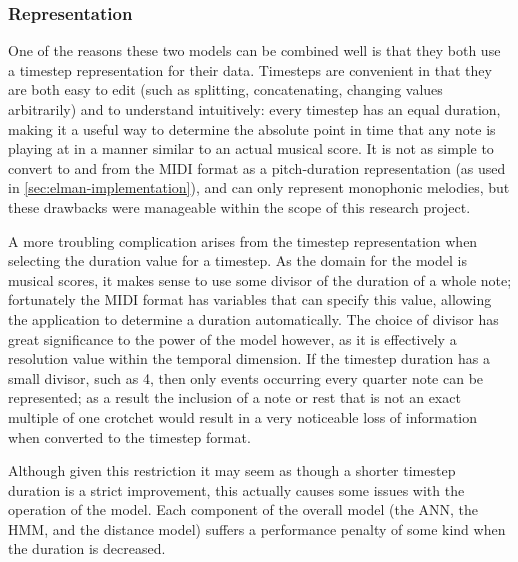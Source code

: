 \documentclass[ author={Stephen Livermore-Tozer},
				supervisor={Dr. Peter Flach},
				degree={MEng},
				title={Algorithmic Co-composition Using Machine Learning},
				subtitle={},
				type={research},
				year={2016} ]{dissertation}
\begin{document}
	\subsubsection{Representation}
	
	One of the reasons these two models can be combined well is that they both use a timestep representation for their data. Timesteps are convenient in that they are both easy to edit (such as splitting, concatenating, changing values arbitrarily) and to understand intuitively: every timestep has an equal duration, making it a useful way to determine the absolute point in time that any note is playing at in a manner similar to an actual musical score. It is not as simple to convert to and from the MIDI format as a pitch-duration representation (as used in \ref{sec:elman-implementation}), and can only represent monophonic melodies, but these drawbacks were manageable within the scope of this research project.
	
	A more troubling complication arises from the timestep representation when selecting the duration value for a timestep. As the domain for the model is musical scores, it makes sense to use some divisor of the duration of a whole note; fortunately the MIDI format has variables that can specify this value, allowing the application to determine a duration automatically. The choice of divisor has great significance to the power of the model however, as it is effectively a resolution value within the temporal dimension. If the timestep duration has a small divisor, such as 4, then only events occurring every quarter note can be represented; as a result the inclusion of a note or rest that is not an exact multiple of one crotchet would result in a very noticeable loss of information when converted to the timestep format. 
	
	
	Although given this restriction it may seem as though a shorter timestep duration is a strict improvement, this actually causes some issues with the operation of the model. Each component of the overall model (the ANN, the HMM, and the distance model) suffers a performance penalty of some kind when the duration is decreased.
	
\end{document}
